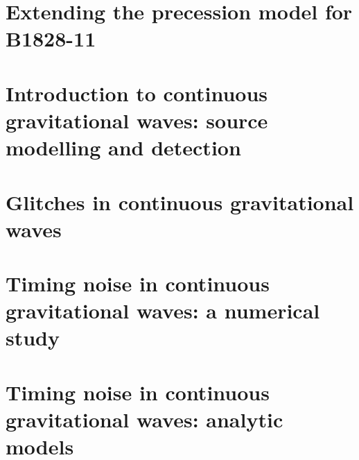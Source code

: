 \documentclass[twoside]{thesis}
\begin{document}
\chapter{Extending the precession model for B1828-11}
\label{sec: extending precession models}

\chapter{Introduction to continuous gravitational waves: source modelling and detection}
\label{sec: intro to cgw}


\chapter{Glitches in continuous gravitational waves}
\label{sec: glitches in cgw}


\chapter{Timing noise in continuous gravitational waves: a numerical study}
\label{sec: timing noise in cgw}


\chapter{Timing noise in continuous gravitational waves: analytic models}
\label{sec: timing in cgw analytic}





\end{document}
